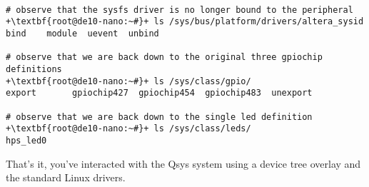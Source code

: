 \begin{flushleft}
\begin{enumerate}[
	label=\textbf{Step \arabic*.},
	leftmargin=*,
	widest={00},
	align=left]
\begin{verbatim}

# observe that the sysfs driver is no longer bound to the peripheral
+\textbf{root@de10-nano:~#}+ ls /sys/bus/platform/drivers/altera_sysid
bind    module  uevent  unbind

# observe that we are back down to the original three gpiochip definitions
+\textbf{root@de10-nano:~#}+ ls /sys/class/gpio/
export       gpiochip427  gpiochip454  gpiochip483  unexport

# observe that we are back down to the single led definition
+\textbf{root@de10-nano:~#}+ ls /sys/class/leds/
hps_led0

\end{verbatim}

\end{enumerate}

That's it, you've interacted with the Qsys system using a device tree overlay and the standard Linux drivers.

\end{flushleft}



